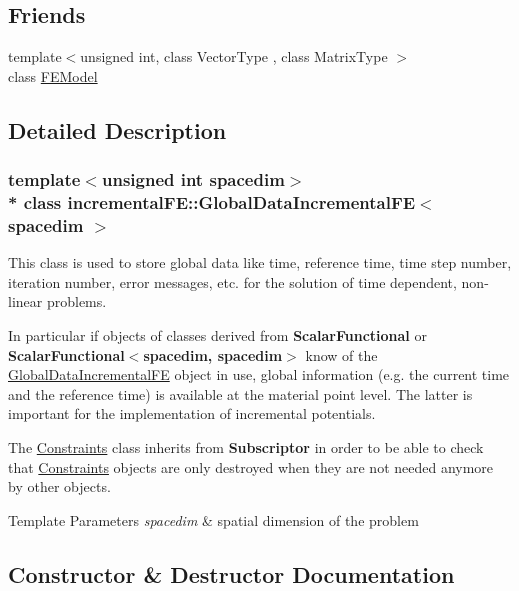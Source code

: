 \subsection*{Friends}
\begin{DoxyCompactItemize}
\item 
{\footnotesize template$<$unsigned int, class Vector\+Type , class Matrix\+Type $>$ }\\class \hyperlink{classincremental_f_e_1_1_global_data_incremental_f_e_a7ca4ac241626a25b2530ff5bb4f075e8}{F\+E\+Model}
\end{DoxyCompactItemize}


\subsection{Detailed Description}
\subsubsection*{template$<$unsigned int spacedim$>$\\*
class incremental\+F\+E\+::\+Global\+Data\+Incremental\+F\+E$<$ spacedim $>$}

This class is used to store global data like time, reference time, time step number, iteration number, error messages, etc. for the solution of time dependent, non-\/linear problems.

In particular if objects of classes derived from {\bf Scalar\+Functional} or {\bf Scalar\+Functional$<$spacedim, spacedim$>$} know of the \hyperlink{classincremental_f_e_1_1_global_data_incremental_f_e}{Global\+Data\+Incremental\+FE} object in use, global information (e.\+g. the current time and the reference time) is available at the material point level. The latter is important for the implementation of incremental potentials.

The \hyperlink{classincremental_f_e_1_1_constraints}{Constraints} class inherits from {\bf Subscriptor} in order to be able to check that \hyperlink{classincremental_f_e_1_1_constraints}{Constraints} objects are only destroyed when they are not needed anymore by other objects.


\begin{DoxyTemplParams}{Template Parameters}
{\em spacedim} & spatial dimension of the problem \\
\hline
\end{DoxyTemplParams}


\subsection{Constructor \& Destructor Documentation}
